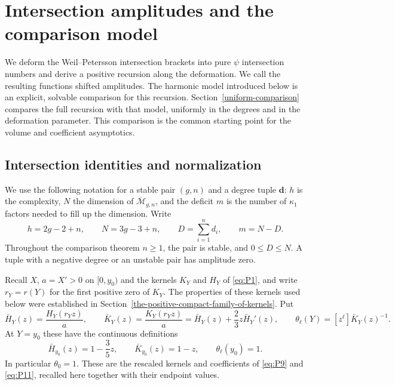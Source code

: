 \section{Intersection amplitudes and the comparison model}\label{exact-amplitudes-and-the-harmonic-model}

We deform the Weil--Petersson intersection brackets into pure $\psi$
intersection numbers and derive a positive recursion along the deformation.
We call the resulting functions shifted amplitudes. The harmonic model
introduced below is an explicit, solvable comparison for this recursion.
Section~\ref{uniform-comparison} compares the full recursion with that
model, uniformly in the degrees and in the deformation parameter.
This comparison is the common starting point for the volume and
coefficient asymptotics.

\subsection{Intersection identities and normalization}\label{exact-amplitudes-standard-intersection-identities-and-normalization}

We use the following notation for a stable pair \((g,n)\) and a degree
tuple \(\mathbf d\): \(h\) is the complexity, \(N\) the dimension of
\(\overline{\mathcal M}_{g,n}\), and the deficit \(m\) is the number of
\(\kappa_1\) factors needed to fill up the dimension. Write \[
h=2g-2+n,\qquad N=3g-3+n,\qquad
D=\sum_{i=1}^n d_i,\qquad m=N-D.
\] Throughout the comparison theorem \(n\ge1\), the pair is stable, and
\(0\le D\le N\). A tuple with a negative degree or an unstable pair has
amplitude zero.

Recall \(X\), \(a=X'>0\) on \([0,y_0)\) and the kernels \(K_Y\) and
\(H_Y\) of \eqref{eq:P1}, and write \(r_Y=r(Y)\) for the first positive
zero of \(K_Y\). The properties of these kernels used below were
established in Section~\ref{the-positive-compact-family-of-kernels}. Put \begin{equation}
\bar H_Y(z)=\frac{H_Y(r_Yz)}a,\qquad
\bar K_Y(z)=\frac{K_Y(r_Yz)}a
      =\bar H_Y(z)+\frac23z\bar H_Y'(z),\qquad
\theta_\ell(Y)=[z^\ell]\bar K_Y(z)^{-1}.
\label{eq:H2}
\end{equation} At \(Y=y_0\) these have the continuous definitions \begin{equation}
\bar H_{y_0}(z)=1-\frac35z,\qquad \bar K_{y_0}(z)=1-z,\qquad
\theta_\ell(y_0)=1.
\label{eq:H3}
\end{equation} In particular \(\theta_0=1\). These are the rescaled kernels and
coefficients of \eqref{eq:P9} and \eqref{eq:P11}, recalled here together
with their endpoint values.

